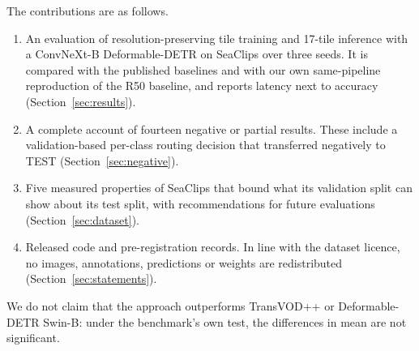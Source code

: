 The contributions are as follows.
\begin{enumerate}
\item An evaluation of resolution-preserving tile training and 17-tile inference with a ConvNeXt-B Deformable-DETR on SeaClips over three seeds. It is compared with the published baselines and with our own same-pipeline reproduction of the R50 baseline, and reports latency next to accuracy (Section~\ref{sec:results}).
\item A complete account of fourteen negative or partial results. These include a validation-based per-class routing decision that transferred negatively to TEST (Section~\ref{sec:negative}).
\item Five measured properties of SeaClips that bound what its validation split can show about its test split, with recommendations for future evaluations (Section~\ref{sec:dataset}).
\item Released code and pre-registration records. In line with the dataset licence, no images, annotations, predictions or weights are redistributed (Section~\ref{sec:statements}).
\end{enumerate}

We do not claim that the approach outperforms TransVOD++ or Deformable-DETR Swin-B: under the benchmark's own test, the differences in mean are not significant.
